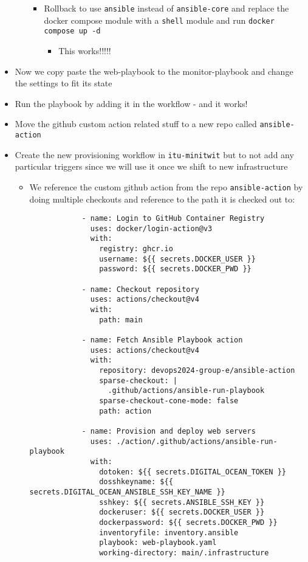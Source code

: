 \begin{itemize}
\begin{itemize}
\begin{itemize}
            \item Rollback to use \texttt{ansible} instead of \texttt{ansible-core} and replace the docker compose module with a \texttt{shell} module and run \texttt{docker compose up\ -d}

            \begin{itemize}
                \item This works!!!!!
            \end{itemize}
        \end{itemize}
    \end{itemize}
    \item Now we copy paste the web-playbook to the monitor-playbook and change the settings to fit its state
    \item Run the playbook by adding it in the workflow - and it works!
    \item Move the github custom action related stuff to a new repo called \texttt{ansible-action}
    \item Create the new provisioning workflow in \texttt{itu-minitwit} but to not add any particular triggers since we will use it once we shift to new infrastructure

    \begin{itemize}
        \item We reference the custom github action from the repo \texttt{ansible-action} by doing multiple checkouts and reference to the path it is checked out to:

        \begin{verbatim}
            - name: Login to GitHub Container Registry
              uses: docker/login-action@v3
              with:
                registry: ghcr.io
                username: ${{ secrets.DOCKER_USER }}
                password: ${{ secrets.DOCKER_PWD }}

            - name: Checkout repository
              uses: actions/checkout@v4
              with:
                path: main

            - name: Fetch Ansible Playbook action
              uses: actions/checkout@v4
              with:
                repository: devops2024-group-e/ansible-action
                sparse-checkout: |
                  .github/actions/ansible-run-playbook
                sparse-checkout-cone-mode: false
                path: action

            - name: Provision and deploy web servers
              uses: ./action/.github/actions/ansible-run-playbook
              with:
                dotoken: ${{ secrets.DIGITAL_OCEAN_TOKEN }}
                dosshkeyname: ${{ secrets.DIGITAL_OCEAN_ANSIBLE_SSH_KEY_NAME }}
                sshkey: ${{ secrets.ANSIBLE_SSH_KEY }}
                dockeruser: ${{ secrets.DOCKER_USER }}
                dockerpassword: ${{ secrets.DOCKER_PWD }}
                inventoryfile: inventory.ansible
                playbook: web-playbook.yaml
                working-directory: main/.infrastructure
        \end{verbatim}
    \end{itemize}
\end{itemize}


